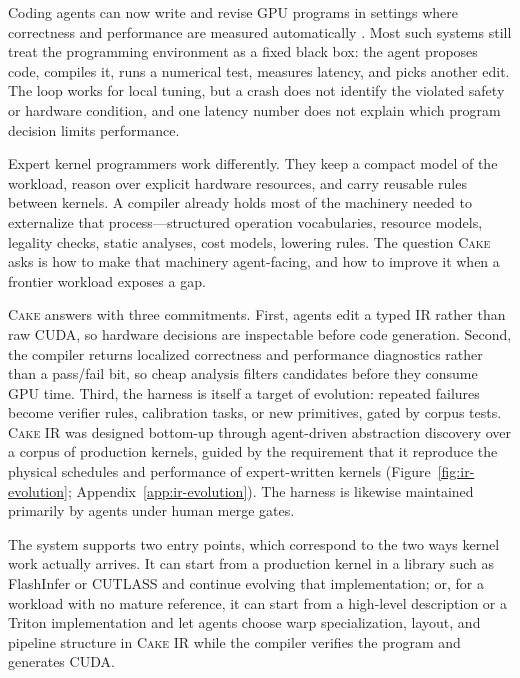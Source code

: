 \documentclass[11pt]{article}
\newcommand{\cake}{\textsc{Cake}}
\newcommand{\cakeir}{\textsc{Cake IR}}
\begin{document}
Coding agents can now write and revise GPU programs in settings where
correctness and performance are measured automatically
\cite{ouyang2024kernelbench,liao2025kernelevolve,dong2026kernelblaster,
accelopt2025,autocomp2025,cheng2026kernelagent,dai2026cudaagent}. Most such
systems still treat the programming environment as a fixed black box: the agent
proposes code, compiles it, runs a numerical test, measures latency, and picks
another edit. The loop works for local tuning, but a crash does not identify the
violated safety or hardware condition, and one latency number does not explain
which program decision limits performance.

Expert kernel programmers work differently. They keep a compact model of the
workload, reason over explicit hardware resources, and carry reusable rules
between kernels. A compiler already holds most of the machinery needed to
externalize that process---structured operation vocabularies, resource models,
legality checks, static analyses, cost models, lowering rules. The question
\cake{} asks is how to make that machinery agent-facing, and how to improve it
when a frontier workload exposes a gap.

\cake{} answers with three commitments. First, agents edit a typed IR rather
than raw CUDA, so hardware decisions are inspectable before code generation.
Second, the compiler returns localized correctness and performance diagnostics
rather than a pass/fail bit, so cheap analysis filters candidates before they
consume GPU time. Third, the harness is itself a target of evolution: repeated
failures become verifier rules, calibration tasks, or new primitives, gated by
corpus tests. \cakeir{} was designed bottom-up through agent-driven abstraction
discovery over a corpus of production kernels, guided by the requirement that
it reproduce the physical schedules and performance of expert-written kernels
(Figure~\ref{fig:ir-evolution}; Appendix~\ref{app:ir-evolution}). The harness is
likewise maintained primarily by agents under human merge gates.

The system supports two entry points, which correspond to the two ways kernel
work actually arrives. It can start from a production kernel in a library such
as FlashInfer or CUTLASS and continue evolving that implementation; or, for a
workload with no mature reference, it can start from a high-level description or
a Triton implementation and let agents choose warp specialization, layout, and
pipeline structure in \cakeir{} while the compiler verifies the program and
generates CUDA.
\end{document}
